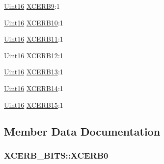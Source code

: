 \begin{DoxyCompactItemize}
\item 
\hyperlink{_d_s_p2833x___device_8h_a59a9f6be4562c327cbfb4f7e8e18f08b}{Uint16} \hyperlink{struct_x_c_e_r_b___b_i_t_s_ae2aedd9e21343c3eaa8a431117c8a02a}{X\+C\+E\+R\+B9}\+:1
\item 
\hyperlink{_d_s_p2833x___device_8h_a59a9f6be4562c327cbfb4f7e8e18f08b}{Uint16} \hyperlink{struct_x_c_e_r_b___b_i_t_s_ad80e8bea88e146526b09a5e500b2b2e0}{X\+C\+E\+R\+B10}\+:1
\item 
\hyperlink{_d_s_p2833x___device_8h_a59a9f6be4562c327cbfb4f7e8e18f08b}{Uint16} \hyperlink{struct_x_c_e_r_b___b_i_t_s_a41a1637a981ba384c6ccfa69fd89e4a6}{X\+C\+E\+R\+B11}\+:1
\item 
\hyperlink{_d_s_p2833x___device_8h_a59a9f6be4562c327cbfb4f7e8e18f08b}{Uint16} \hyperlink{struct_x_c_e_r_b___b_i_t_s_a3af1095413c094bae7935278bc7d61b3}{X\+C\+E\+R\+B12}\+:1
\item 
\hyperlink{_d_s_p2833x___device_8h_a59a9f6be4562c327cbfb4f7e8e18f08b}{Uint16} \hyperlink{struct_x_c_e_r_b___b_i_t_s_a9b5c36bdb2012ac8153376deb78312e1}{X\+C\+E\+R\+B13}\+:1
\item 
\hyperlink{_d_s_p2833x___device_8h_a59a9f6be4562c327cbfb4f7e8e18f08b}{Uint16} \hyperlink{struct_x_c_e_r_b___b_i_t_s_a6568077649bff16cdfec5e88112243b1}{X\+C\+E\+R\+B14}\+:1
\item 
\hyperlink{_d_s_p2833x___device_8h_a59a9f6be4562c327cbfb4f7e8e18f08b}{Uint16} \hyperlink{struct_x_c_e_r_b___b_i_t_s_aaaefb1bb0711547560584fcb20685aac}{X\+C\+E\+R\+B15}\+:1
\end{DoxyCompactItemize}


\subsection{Member Data Documentation}
\hypertarget{struct_x_c_e_r_b___b_i_t_s_a2b90f87983f78cbcde96937f5b1d84c1}{}
\subsubsection[{X\+C\+E\+R\+B0}]{ X\+C\+E\+R\+B\+\_\+\+B\+I\+T\+S\+::\+X\+C\+E\+R\+B0}\label{struct_x_c_e_r_b___b_i_t_s_a2b90f87983f78cbcde96937f5b1d84c1}
\hypertarget{struct_x_c_e_r_b___b_i_t_s_a1171855f5cbdf112cc7917d76bb49934}{}
